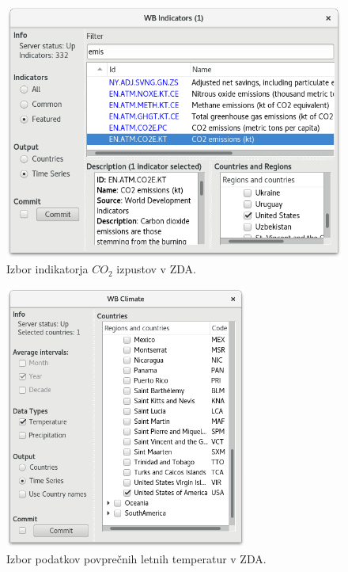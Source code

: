 \begin{figure}
\begin{center}
\includegraphics[width=13.75cm]{pic/var_indicator_select.png}
\end{center}
\caption{Izbor indikatorja $CO_2$ izpustov v ZDA.}
\label{var_indicator_select}
\end{figure} 

\begin{figure}
\begin{center}
\includegraphics[width=8cm]{pic/var_climate_select.png}
\end{center}
\caption{Izbor podatkov povprečnih letnih temperatur v ZDA.}
\label{var_climate_select}
\end{figure} 

